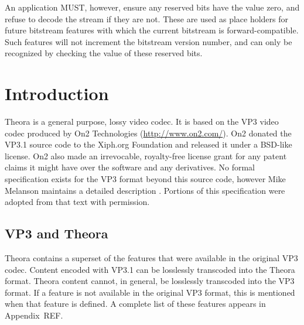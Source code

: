 \documentclass[11pt,letterpaper]{book}
\numberwithin{equation}{chapter}
\numberwithin{figure}{chapter}
\numberwithin{table}{chapter}
\begin{document}
An application MUST, however, ensure any reserved bits have the value zero, and
 refuse to decode the stream if they are not.
These are used as place holders for future bitstream features with which the
 current bitstream is forward-compatible.
Such features will not increment the bitstream version number, and can only be
 recognized by checking the value of these reserved bits.

\cleardoublepage



\mainmatter

\setcounter{page}{1}
                                                                                
\chapter{Introduction}

%

Theora is a general purpose, lossy video codec.
It is based on the VP3 video codec produced by On2 Technologies
 (\url{http://www.on2.com/}).
On2 donated the VP3.1 source code to the Xiph.org Foundation and released it
 under a BSD-like license.
On2 also made an irrevocable, royalty-free license grant for any patent claims
 it might have over the software and any derivatives.
No formal specification exists for the VP3 format beyond this source code,
 however Mike Melanson maintains a detailed description \cite{Mel04}.
Portions of this specification were adopted from that text with permission.

\section{VP3 and Theora}

Theora contains a superset of the features that were available in the original
 VP3 codec.
Content encoded with VP3.1 can be losslessly transcoded into the Theora format.
Theora content cannot, in general, be losslessly transcoded into the VP3
 format.
If a feature is not available in the original VP3 format, this is mentioned
 when that feature is defined.
A complete list of these features appears in Appendix~REF.
                                                                                  
\end{document}
